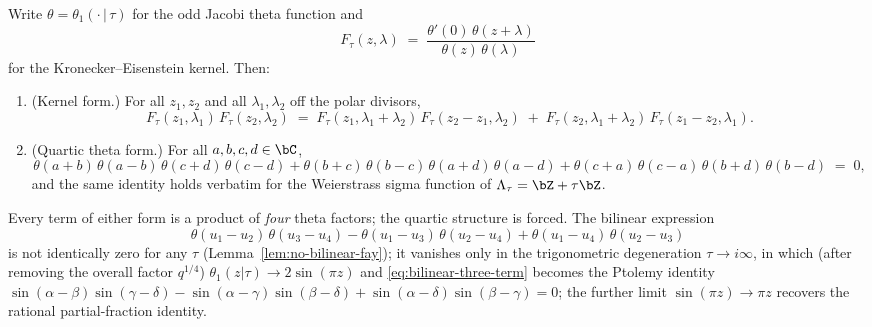\begin{theorem}\label{thm:fay}
Write $\theta = \theta_1(\cdot\,|\,\tau)$ for the odd Jacobi theta
function and
\[
F_\tau(z,\lambda)
\;=\; \frac{\theta'(0)\,\theta(z+\lambda)}{\theta(z)\,\theta(\lambda)}
\]
for the Kronecker--Eisenstein kernel. Then:
\begin{enumerate}[label=\textup{(\roman*)}]
\item \textup{(}Kernel form.\textup{)} For all $z_1, z_2$ and all
$\lambda_1, \lambda_2$ off the polar divisors,
\begin{equation}\label{eq:fay-kernel}
F_\tau(z_1,\lambda_1)\,F_\tau(z_2,\lambda_2)
\;=\;
F_\tau(z_1,\lambda_1{+}\lambda_2)\,F_\tau(z_2{-}z_1,\lambda_2)
\;+\;
F_\tau(z_2,\lambda_1{+}\lambda_2)\,F_\tau(z_1{-}z_2,\lambda_1).
\end{equation}
\item \textup{(}Quartic theta form.\textup{)} For all $a,b,c,d \in \bC$,
\begin{equation}\label{eq:fay-quartic}
\theta(a{+}b)\,\theta(a{-}b)\,\theta(c{+}d)\,\theta(c{-}d)
+ \theta(b{+}c)\,\theta(b{-}c)\,\theta(a{+}d)\,\theta(a{-}d)
+ \theta(c{+}a)\,\theta(c{-}a)\,\theta(b{+}d)\,\theta(b{-}d)
\;=\; 0,
\end{equation}
and the same identity holds verbatim for the Weierstrass sigma
function of $\Lambda_\tau = \bZ + \tau\bZ$.
\end{enumerate}
Every term of either form is a product of \emph{four} theta factors;
the quartic structure is forced. The bilinear expression
\begin{equation}\label{eq:bilinear-three-term}
\theta(u_1{-}u_2)\,\theta(u_3{-}u_4)
- \theta(u_1{-}u_3)\,\theta(u_2{-}u_4)
+ \theta(u_1{-}u_4)\,\theta(u_2{-}u_3)
\end{equation}
is not identically zero for any $\tau$
(Lemma~\ref{lem:no-bilinear-fay}); it vanishes only in the
trigonometric degeneration $\tau \to i\infty$, in which (after
removing the overall factor $q^{1/4}$) $\theta_1(z|\tau) \to
2\sin(\pi z)$ and \eqref{eq:bilinear-three-term} becomes the Ptolemy
identity $\sin(\alpha{-}\beta)\sin(\gamma{-}\delta) -
\sin(\alpha{-}\gamma)\sin(\beta{-}\delta) +
\sin(\alpha{-}\delta)\sin(\beta{-}\gamma) = 0$; the further limit
$\sin(\pi z) \to \pi z$ recovers the rational partial-fraction
identity.
\end{theorem}

